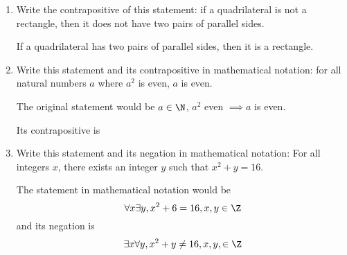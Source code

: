 \question 
\begin{enumerate}[label=\alph*]
\item Write the contrapositive of this statement: if a quadrilateral is not a rectangle, then it does not have two 
pairs of parallel sides.
\begin{solution}[2in]
If a quadrilateral has two pairs of parallel sides, then it is a rectangle.
\end{solution}
\item Write this statement and its contrapositive in mathematical notation: for all natural numbers $a$ where $a^2$ is even, $a$ is even.
\begin{solution}[2in] 
The original statement would be 
$a \in \N$, $a^2$ even $\implies a$ is even. 

Its contrapositive is 
\end{solution}
\item Write this statement and its negation in mathematical notation: For all integers $x$, there exists an integer $y$ such that $x^2 + y = 16$.
\begin{solution}
The statement in mathematical notation would be 
$$\forall x \exists y, x^2+6 = 16, x,y\in\Z$$
and its negation is
$$\exists x  \forall y, x^2 + y \neq 16, x,y, \in \Z$$
\end{solution}
\end{enumerate}

\clearpage

